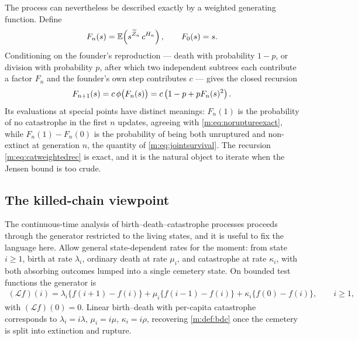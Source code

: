 The process can nevertheless be described exactly by a weighted generating
function. Define
\begin{equation}
\label{m:eq:catweightedpgf}
F_n(s) = \mathbb{E}\!\left(s^{\widetilde Z_n}\,c^{H_n}\right),
\qquad F_0(s) = s .
\end{equation}
Conditioning on the founder's reproduction --- death with probability $1-p$, or
division with probability $p$, after which two independent subtrees each
contribute a factor $F_n$ and the founder's own step contributes $c$ --- gives
the closed recursion
\begin{equation}
\label{m:eq:catweightedrec}
F_{n+1}(s) = c\,\phi\bigl(F_n(s)\bigr)
= c\left(1-p+pF_n(s)^2\right) .
\end{equation}
Its evaluations at special points have distinct meanings: $F_n(1)$ is the
probability of no catastrophe in the first $n$ updates, agreeing with
\cref{m:eq:noruptureexact}, while $F_n(1)-F_n(0)$ is the probability of being
both unruptured and non-extinct at generation $n$, the quantity of
\cref{m:eq:jointsurvival}. The recursion \cref{m:eq:catweightedrec} is exact,
and it is the natural object to iterate when the Jensen bound is too crude.

\subsection*{The killed-chain viewpoint}

The continuous-time analysis of birth--death--catastrophe processes proceeds
through the generator restricted to the living states, and it is useful to fix
the language here. Allow general state-dependent rates for the moment: from
state $i\ge1$, birth at rate $\lambda_i$, ordinary death at rate $\mu_i$, and
catastrophe at rate $\kappa_i$, with both absorbing outcomes lumped into a
single cemetery state. On bounded test functions the generator is
\begin{multline*}
(\mathcal Lf)(i)
= \lambda_i\{f(i+1)-f(i)\} + \mu_i\{f(i-1)-f(i)\}
+ \kappa_i\{f(0)-f(i)\},
\qquad i\ge1,
\end{multline*}
with $(\mathcal Lf)(0)=0$. Linear birth--death with per-capita catastrophe
corresponds to $\lambda_i=i\lambda$, $\mu_i=i\mu$, $\kappa_i=i\rho$, recovering
\cref{m:def:bdc} once the cemetery is split into extinction and rupture.

